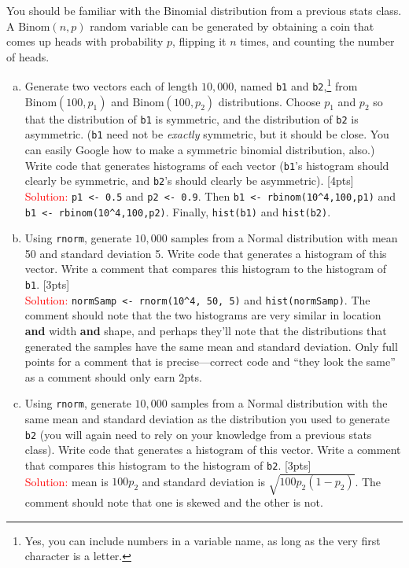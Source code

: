 \documentclass[12pt]{article}
\newcommand{\Binom}{\text{Binom}}
\newcommand{\ans}{\\\textcolor{red}{Solution: }}
\begin{document}
You should be familiar with the Binomial distribution from a previous stats class. A $\Binom(n,p)$ random variable can be generated by obtaining a coin that comes up heads with probability $p$, flipping it $n$ times, and counting the number of heads.

\begin{enumerate}[(a)]
	\item Generate two vectors each of length $10,000$, named \verb|b1| and \verb|b2|,\footnote{Yes, you can include numbers in a variable name, as long as the very first character is a letter.} from $\Binom(100,p_1)$ and $\Binom(100,p_2)$ distributions. Choose $p_1$ and $p_2$ so that the distribution of \verb|b1| is symmetric, and the distribution of \verb|b2| is asymmetric. (\verb|b1| need not be \textit{exactly} symmetric, but it should be close. You can easily Google how to make a symmetric binomial distribution, also.) Write code that generates histograms of each vector (\verb|b1|'s histogram should clearly be symmetric, and \verb|b2|'s should clearly be asymmetric). [4pts] \ans \verb|p1 <- 0.5| and \verb|p2 <- 0.9|. Then \verb|b1 <- rbinom(10^4,100,p1)| and \verb|b1 <- rbinom(10^4,100,p2)|. Finally, \verb|hist(b1)| and \verb|hist(b2)|.
	\item Using \verb|rnorm|, generate $10,000$ samples from a Normal distribution with mean 50 and standard deviation 5. Write code that generates a histogram of this vector. Write a comment that compares this histogram to the histogram of \verb|b1|. [3pts] \ans \verb|normSamp <- rnorm(10^4, 50, 5)| and \verb|hist(normSamp)|. The comment should note that the two histograms are very similar in location \textbf{and} width \textbf{and} shape, and perhaps they'll note that the distributions that generated the samples have the same mean and standard deviation. Only full points for a comment that is precise---correct code and ``they look the same'' as a comment should only earn 2pts.
	\item Using \verb|rnorm|, generate $10,000$ samples from a Normal distribution with the same mean and standard deviation as the distribution you used to generate \verb|b2| (you will again need to rely on your knowledge from a previous stats class). Write code that generates a histogram of this vector. Write a comment that compares this histogram to the histogram of \verb|b2|. [3pts] \ans mean is $100 p_2$ and standard deviation is $\sqrt{100p_2(1-p_2)}$. The comment should note that one is skewed and the other is not.
\end{enumerate}
\end{document}
